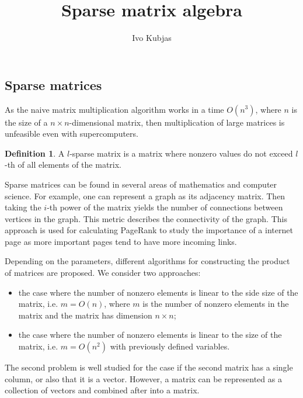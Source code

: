 \documentclass[portrait,a0]{sciposter}
\title{Sparse matrix algebra}
\author{Ivo Kubjas}
\institute{Institute of Computer Science, University of Tartu}
\theoremstyle{definition}\newtheorem{definition}{Definition}
\theoremstyle{plain}\newtheorem{example}{Example}
\theoremstyle{plain} \newtheorem{theorem}{Theorem}
\begin{document}
\maketitle

\begin{multicols}{2}
    \section{Sparse matrices}

    As the naive matrix multiplication algorithm works in a time $O(n^3)$, where
    $n$ is the size of a $n \times n$-dimensional matrix, then multiplication of
    large matrices is unfeasible even with supercomputers.

    \begin{definition}
        A $l$-sparse matrix is a matrix where nonzero values do not exceed
        $l$-th of all elements of the matrix.
    \end{definition}

    Sparse matrices can be found in several areas of mathematics and computer
    science. For example, one can represent a graph as its adjacency matrix.
    Then taking the $i$-th power of the matrix yields the number of connections
    between vertices in the graph. This metric describes the connectivity of the
    graph. This approach is used for calculating PageRank to study the
    importance of a internet page as more important pages tend to have more
    incoming links.

    Depending on the parameters, different algorithms for constructing the
    product of matrices are proposed. We consider two approaches:
    \begin{itemize}
        \item the case where the number of nonzero elements is linear to the
            side size of the matrix, i.e. $m = O(n)$, where $m$ is the number of
            nonzero elements in the matrix and the matrix has dimension $n
            \times n$;
        \item the case where the number of nonzero elements is linear to the
            size of the matrix, i.e. $m = O(n^2)$ with previously defined
            variables.
    \end{itemize}

    The second problem is well studied for the case if the second matrix has a
    single column, or also that it is a vector. However, a matrix can be
    represented as a collection of vectors and combined after into a matrix.


\end{multicols}
\end{document}
